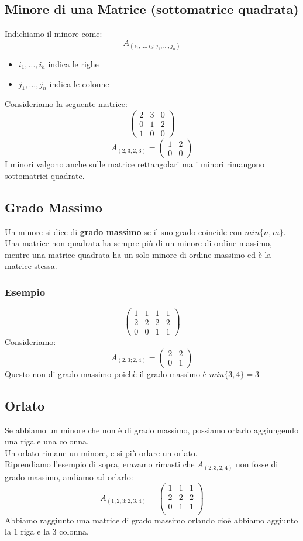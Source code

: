 \subsection{Minore di una Matrice (sottomatrice quadrata)}
Indichiamo il minore come:
$$ A_{(i_1,...,i_h; j_1,...,j_n)} $$
\begin{itemize}
\item[]$i_1,...,i_h$ indica le righe
\item[]$j_1,...,j_n$ indica le colonne
\end{itemize}
Consideriamo la seguente matrice:
$$
\begin{pmatrix}
2 & 3 & 0 \\
0 & 1 & 2 \\
1 & 0 & 0
\end{pmatrix}
$$
$$ A_{(2,3;2,3)} = \begin{pmatrix}
1 & 2\\
0 & 0
\end{pmatrix} $$
I minori valgono anche sulle matrice rettangolari ma i minori rimangono sottomatrici quadrate.\\

\subsection{Grado Massimo}
Un minore si dice di \textbf{grado massimo} se il suo grado coincide con $min\{n,m\}$.\\
Una matrice non quadrata ha sempre più di un minore di ordine massimo, mentre una matrice quadrata ha un solo minore di ordine massimo ed è la matrice stessa.
\subsubsection{Esempio}
$$
\begin{pmatrix}
1 & 1 & 1 & 1 \\
2 & 2 & 2 & 2 \\
0 & 0 & 1 & 1 
\end{pmatrix}
$$
Consideriamo:
$$ A_{(2,3;2,4)} = \begin{pmatrix}
2 & 2 \\ 0 & 1
\end{pmatrix}$$
Questo non di grado massimo poichè il grado massimo è $min\{3,4\} = 3$

\subsection{Orlato}
Se abbiamo un minore che non è di grado massimo, possiamo orlarlo aggiungendo una riga e una colonna.\\
Un orlato rimane un minore, e si più orlare un orlato.\\
Riprendiamo l'esempio di sopra, eravamo rimasti che $A_{(2,3;2,4)}$ non fosse di grado massimo, andiamo ad orlarlo:
$$ A_{(1,2,3;2,3,4)} = \begin{pmatrix}
1 & 1 & 1 \\
2 & 2 & 2 \\
0 & 1 & 1 \\
\end{pmatrix} $$
Abbiamo raggiunto una matrice di grado massimo orlando cioè abbiamo aggiunto la $1$ riga e la $3$ colonna.

